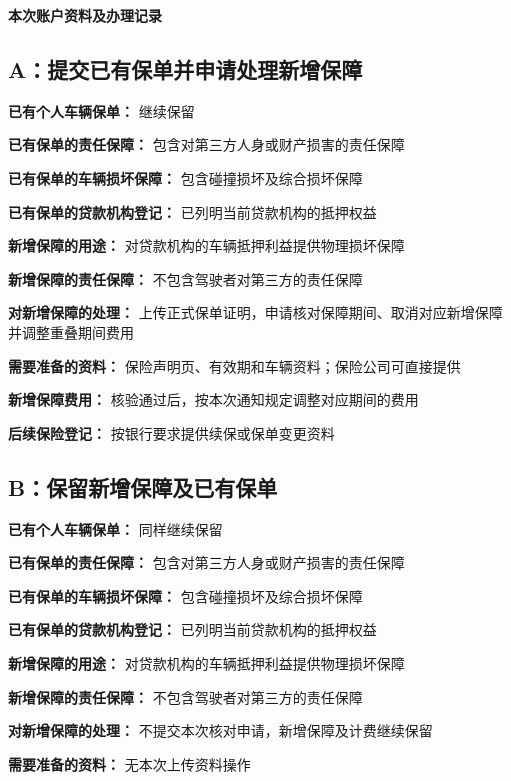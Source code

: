 \documentclass[UTF8,fontset=none,11pt,a4paper]{ctexart}
\begin{document}
{\noindent\fontsize{20}{25}\selectfont\bfseries 本次账户资料及办理记录\par}
\vspace{10pt}
\subsection*{A：提交已有保单并申请处理新增保障}
\textbf{已有个人车辆保单：} 继续保留


\textbf{已有保单的责任保障：} 包含对第三方人身或财产损害的责任保障


\textbf{已有保单的车辆损坏保障：} 包含碰撞损坏及综合损坏保障


\textbf{已有保单的贷款机构登记：} 已列明当前贷款机构的抵押权益


\textbf{新增保障的用途：} 对贷款机构的车辆抵押利益提供物理损坏保障


\textbf{新增保障的责任保障：} 不包含驾驶者对第三方的责任保障


\textbf{对新增保障的处理：} 上传正式保单证明，申请核对保障期间、取消对应新增保障并调整重叠期间费用


\textbf{需要准备的资料：} 保险声明页、有效期和车辆资料；保险公司可直接提供


\textbf{新增保障费用：} 核验通过后，按本次通知规定调整对应期间的费用


\textbf{后续保险登记：} 按银行要求提供续保或保单变更资料


\subsection*{B：保留新增保障及已有保单}
\textbf{已有个人车辆保单：} 同样继续保留


\textbf{已有保单的责任保障：} 包含对第三方人身或财产损害的责任保障


\textbf{已有保单的车辆损坏保障：} 包含碰撞损坏及综合损坏保障


\textbf{已有保单的贷款机构登记：} 已列明当前贷款机构的抵押权益


\textbf{新增保障的用途：} 对贷款机构的车辆抵押利益提供物理损坏保障


\textbf{新增保障的责任保障：} 不包含驾驶者对第三方的责任保障


\textbf{对新增保障的处理：} 不提交本次核对申请，新增保障及计费继续保留


\textbf{需要准备的资料：} 无本次上传资料操作
\end{document}
